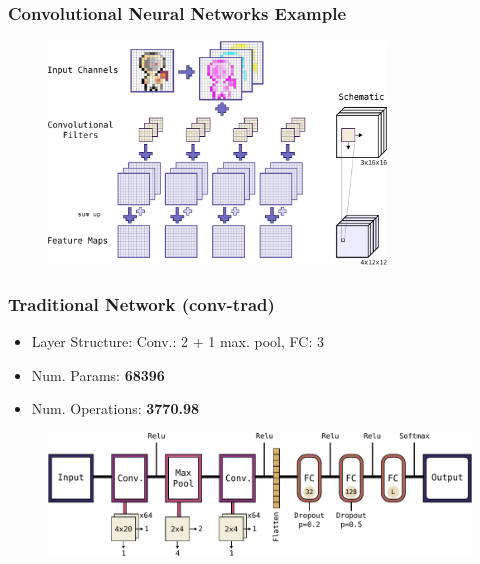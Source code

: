 \begin{frame}
  \frametitle{Convolutional Neural Networks Example}
  \begin{figure} \includegraphics[width=0.8\textwidth]{../4_nn/figs/nn_theory_cnn_basics.pdf} \end{figure}
\end{frame}

\begin{frame}
  \frametitle{Traditional Network (conv-trad)}
  \vspace{-0.5cm}
  \begin{itemize}
    \item Layer Structure: Conv.: 2 + 1 max. pool, FC: 3 
    \item Num. Params: \textbf{\num{68396}}
    \item Num. Operations: \textbf{\SI{3770.98}{\kilo\ops}}
  \end{itemize}
  \begin{figure} \includegraphics[height=0.35\textheight]{../4_nn/figs/nn_arch_cnn_trad.pdf} \end{figure}
\end{frame}


